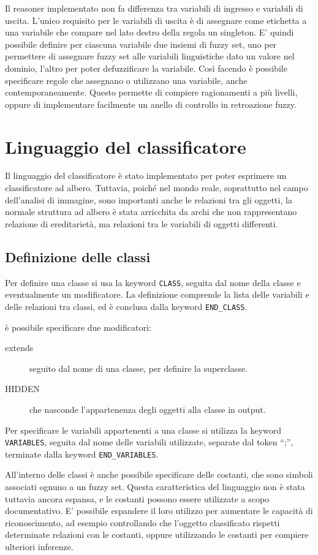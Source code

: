 Il reasoner implementato non fa differenza tra variabili di ingresso e variabili di uscita. L'unico requisito per le variabili di uscita è di assegnare come etichetta a una variabile che compare nel lato destro della regola un singleton. E' quindi possibile definire per ciascuna variabile due insiemi di fuzzy set, uno per permettere di assegnare fuzzy set alle variabili linguistiche dato un valore nel dominio, l'altro per poter defuzzificare la variabile. Così facendo è possibile specificare regole che assegnano o utilizzano una variabile, anche contemporaneamente. Questo permette di compiere ragionamenti a più livelli, oppure di implementare facilmente un anello di controllo in retroazione fuzzy. 

\section{Linguaggio del classificatore}
Il linguaggio del classificatore è stato implementato per poter esprimere un classificatore ad albero. Tuttavia, poiché nel mondo reale, soprattutto nel campo dell'analisi di immagine, sono importanti anche le relazioni tra gli oggetti, la normale struttura ad albero è stata arricchita da archi che non rappresentano relazione di ereditarietà, ma relazioni tra le variabili di oggetti differenti.

\subsection{Definizione delle classi}
Per definire una classe si usa la keyword \verb|CLASS|, seguita dal nome della classe e eventualmente un modificatore. La definizione comprende la lista delle variabili e delle relazioni tra classi, ed è conclusa dalla keyword \verb|END_CLASS|.

è possibile specificare due modificatori:
\begin{description}
 \item [extends] seguito dal nome di una classe, per definire la superclasse.
 \item [HIDDEN] che nasconde l'appartenenza degli oggetti alla classe in output.
\end{description}

Per specificare le variabili appartenenti a una classe si utilizza la keyword \verb|VARIABLES|, seguita dal nome delle variabili utilizzate, separate dal token ``;'',  terminate dalla keyword \verb|END_VARIABLES|.

All'interno delle classi è anche possibile specificare delle costanti, che sono simboli associati ognuno a un fuzzy set. Questa caratteristica del linguaggio non è stata tuttavia ancora espansa, e le costanti possono essere utilizzate a scopo documentativo. E' possibile espandere il loro utilizzo per aumentare le capacità di riconoscimento, ad esempio controllando che l'oggetto classificato rispetti determinate relazioni con le costanti, oppure utilizzando le costanti per compiere ulteriori inferenze.

